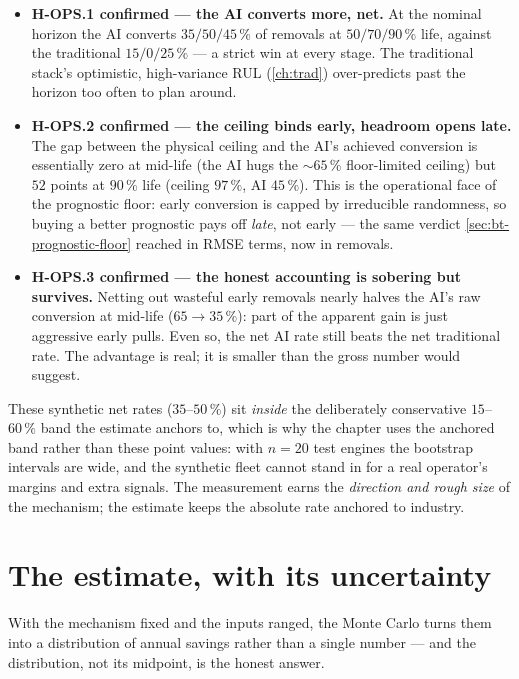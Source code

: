 \begin{itemize}
  \item \textbf{H-OPS.1 confirmed --- the AI converts more, net.} At the nominal horizon the AI
    converts $35/50/45\,\%$ of removals at $50/70/90\,\%$ life, against the traditional
    $15/0/25\,\%$ --- a strict win at every stage. The traditional stack's optimistic,
    high-variance RUL (\cref{ch:trad}) over-predicts past the horizon too often to plan around.
  \item \textbf{H-OPS.2 confirmed --- the ceiling binds early, headroom opens late.} The gap
    between the physical ceiling and the AI's achieved conversion is essentially zero at
    mid-life (the AI hugs the $\sim\!65\,\%$ floor-limited ceiling) but $52$ points at
    $90\,\%$ life (ceiling $97\,\%$, AI $45\,\%$). This is the operational face of the
    prognostic floor: early conversion is capped by irreducible randomness, so buying a better
    prognostic pays off \emph{late}, not early --- the same verdict \cref{sec:bt-prognostic-floor}
    reached in RMSE terms, now in removals.
  \item \textbf{H-OPS.3 confirmed --- the honest accounting is sobering but survives.} Netting
    out wasteful early removals nearly halves the AI's raw conversion at mid-life ($65\to35\,\%$):
    part of the apparent gain is just aggressive early pulls. Even so, the net AI rate still
    beats the net traditional rate. The advantage is real; it is smaller than the gross number
    would suggest.
\end{itemize}

These synthetic net rates ($35$--$50\,\%$) sit \emph{inside} the deliberately conservative
$15$--$60\,\%$ band the estimate anchors to, which is why the chapter uses the anchored band
rather than these point values: with $n=20$ test engines the bootstrap intervals are wide, and
the synthetic fleet cannot stand in for a real operator's margins and extra signals. The
measurement earns the \emph{direction and rough size} of the mechanism; the estimate keeps the
absolute rate anchored to industry.

\section{The estimate, with its uncertainty}
\label{sec:econ-result}

With the mechanism fixed and the inputs ranged, the Monte Carlo turns them into a
distribution of annual savings rather than a single number --- and the distribution, not its
midpoint, is the honest answer.

